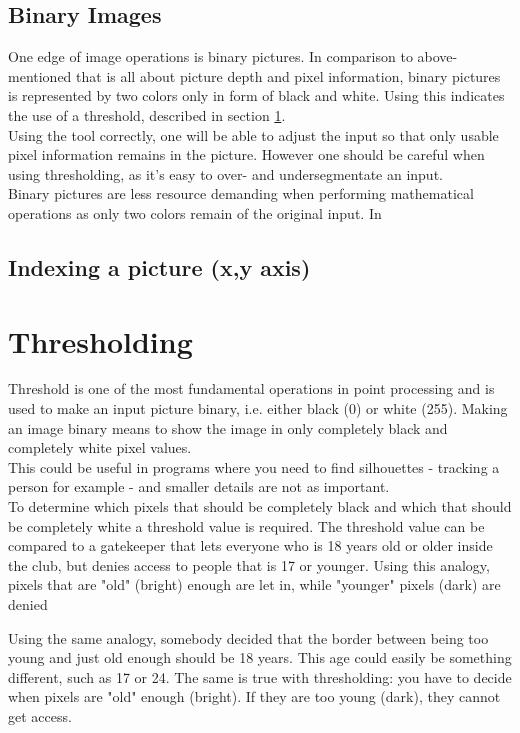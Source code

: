\subsection{Binary Images}
One edge of image operations is binary pictures. In comparison to above-mentioned that is all about picture depth and pixel information, binary pictures is represented by two colors only in form of black and white. Using this indicates the use of a threshold, described in section \ref{sec:Thresholding}.\\
Using the tool correctly, one will be able to adjust the input so that only usable pixel information remains in the picture. However one should be careful when using thresholding, as it's easy to over- and undersegmentate an input.\\
Binary pictures are less resource demanding when performing mathematical operations as only two colors remain of the original input. In 

\subsection{Indexing a picture (x,y axis)}

   


\section{Thresholding}
\label{sec:Thresholding}
Threshold is one of the most fundamental operations in point processing  and is used to make an input picture binary, i.e. either black (0) or white (255). Making an image binary means to show the image in only completely black and completely white pixel values. \\
This could be useful in programs where you need to find silhouettes - tracking a person for example - and smaller details are not as important. \\
To determine which pixels that should be completely black and which that should be completely white a threshold value is required. The threshold value can be compared to a gatekeeper that lets everyone who is 18 years old or older inside the club, but denies access to people that is 17 or younger. Using this analogy, pixels that are "old" (bright) enough are let in, while "younger" pixels (dark) are denied

Using the same analogy, somebody decided that the border between being too young and just old enough should be 18 years. This age could easily be something different, such as 17 or 24. The same is true with thresholding: you have to decide when pixels are "old" enough (bright). If they are too young (dark), they cannot get access.

